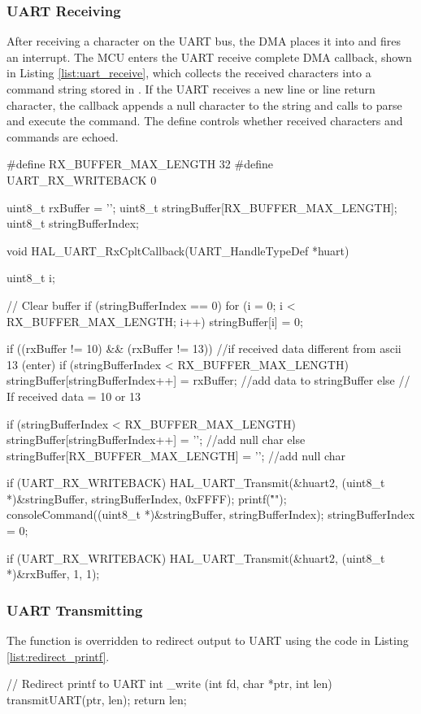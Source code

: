 \subsubsection{UART Receiving}
After receiving a character on the UART bus, the DMA places it into  and fires an interrupt. The MCU enters the UART receive complete DMA callback, shown in Listing \ref{list:uart_receive}, which collects the received characters into a command string stored in . If the UART receives a new line or line return character, the callback appends a null character to the string and calls  to parse and execute the command. The define  controls whether received characters and commands are echoed.
\begin{clisting}[caption={UART Receive Callback},label={list:uart_receive}]
#define RX_BUFFER_MAX_LENGTH 32 
#define UART_RX_WRITEBACK 0

uint8_t rxBuffer = '';
uint8_t stringBuffer[RX_BUFFER_MAX_LENGTH];
uint8_t stringBufferIndex;

void HAL_UART_RxCpltCallback(UART_HandleTypeDef *huart)
{
    uint8_t i;

    // Clear buffer
    if (stringBufferIndex == 0) {for (i = 0; i < RX_BUFFER_MAX_LENGTH; i++) stringBuffer[i] = 0;}	

    if ((rxBuffer != 10) && (rxBuffer != 13))	//if received data different from ascii 13 (enter)
    {
        if (stringBufferIndex < RX_BUFFER_MAX_LENGTH){
            stringBuffer[stringBufferIndex++] = rxBuffer; //add data to stringBuffer
        }
    }
    else // If received data = 10 or 13
    {
        if (stringBufferIndex < RX_BUFFER_MAX_LENGTH){
            stringBuffer[stringBufferIndex++] = '\0'; //add null char
        } else {
            stringBuffer[RX_BUFFER_MAX_LENGTH] = '\0'; //add null char
        }

        if (UART_RX_WRITEBACK){
            HAL_UART_Transmit(&huart2, (uint8_t *)&stringBuffer, stringBufferIndex, 0xFFFF);
            printf("\r\n");
        }
        consoleCommand((uint8_t *)&stringBuffer, stringBufferIndex);
        stringBufferIndex = 0;
    }

    if (UART_RX_WRITEBACK){
        HAL_UART_Transmit(&huart2, (uint8_t *)&rxBuffer, 1, 1);
    }
}
\end{clisting}

\subsubsection{UART Transmitting}
The  function is overridden to redirect  output to UART using the code in Listing \ref{list:redirect_printf}.
\begin{clisting}[caption={Redirect printf()},label={list:redirect_printf}]
// Redirect printf to UART
int _write (int fd, char *ptr, int len) 
{ 
	transmitUART(ptr, len);
	return len; 
}
\end{clisting}

